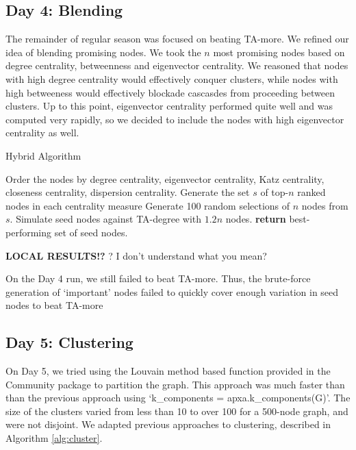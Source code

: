 \documentclass[letterpaper, 11pt]{article}
\begin{document}
\subsection{Day 4: Blending}
The remainder of regular season was focused on beating TA-more. We refined our idea of blending promising nodes. We took the $n$ most promising nodes based on degree centrality, betweenness and eigenvector centrality. We reasoned that nodes with high degree centrality would effectively conquer clusters, while nodes with high betweeness would effectively blockade cascasdes from proceeding between clusters. Up to this point, eigenvector centrality performed quite well and was computed very rapidly, so we decided to include the nodes with high eigenvector centrality as well.

\begin{algorithm}
\caption{Hybrid Algorithm}
\begin{algorithmic}[1]
\State Order the nodes by degree centrality, eigenvector centrality, Katz centrality, closeness centrality, dispersion centrality.
\State Generate the set $s$ of top-$n$ ranked nodes in each centrality measure
\State Generate 100 random selections of $n$ nodes from $s$.
\State Simulate seed nodes against TA-degree with $1.2n$ nodes.
\EndFor
\State \textbf{return} best-performing set of seed nodes.
\EndProcedure
\end{algorithmic}
\label{alg:hybrid}
\end{algorithm}

\textbf{LOCAL RESULTS!?} ? I don't understand what you mean?

On the Day 4 run, we still failed to beat TA-more. Thus, the brute-force generation of `important' nodes failed to quickly cover enough variation in seed nodes to beat TA-more

\subsection{Day 5: Clustering}
On Day 5, we tried using the Louvain method \cite{louvain} based function provided in the Community package to partition the graph. This approach was much faster than than the previous approach using ‘k\_components = apxa.k\_components(G)’. The size of the clusters varied from less than 10 to over 100 for a 500-node graph, and were not disjoint. We adapted previous approaches to clustering, described in Algorithm \ref{alg:cluster}.
\end{document}
